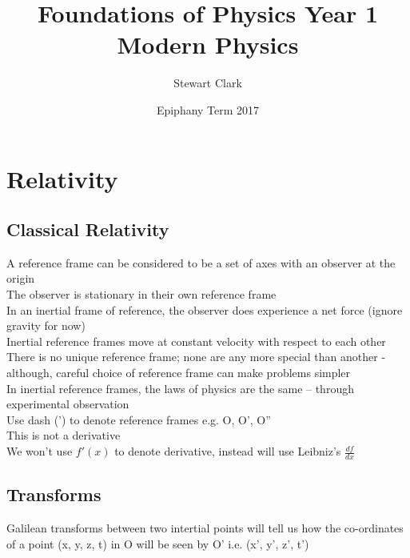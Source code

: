 \documentclass[a4paper, 11pt, fleqn, normalem]{report}
\title{Foundations of Physics Year 1 \\ Modern Physics \vspace{-20pt}}
\author{Stewart Clark}
\date{\vspace{-15pt}Epiphany Term 2017}
\begin{document}
\maketitle
\thispagestyle{fancy}

\tableofcontents

\chapter{Relativity}
\section{Classical Relativity}
A reference frame can be considered to be a set of axes with an observer at the origin \\
The observer is stationary in their own reference frame \\
In an inertial frame of reference, the observer does experience a net force (ignore gravity for now) \\
Inertial reference frames move at constant velocity with respect to each other \\
There is no unique reference frame; none are any more special than another - although, careful choice of reference frame can make problems simpler \\
In inertial reference frames, the laws of physics are the same -- through experimental observation \\
Use dash (') to denote reference frames e.g. O, O', O'' \\
This is not a derivative \\
We won't use $f'(x)$ to denote derivative, instead will use Leibniz's $\frac{df}{dx}$

\section{Transforms}
Galilean transforms between two intertial points will tell us how the co-ordinates of a point (x, y, z, t) in O will be seen by O' i.e. (x', y', z', t')
\end{document}
